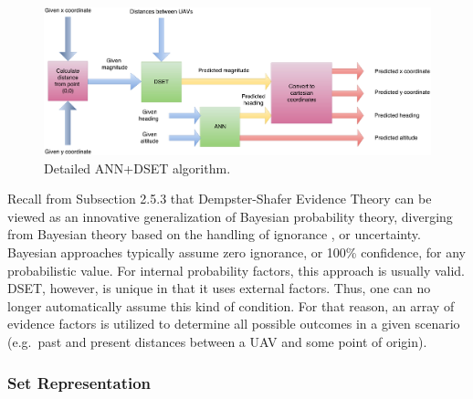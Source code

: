 \documentclass[12pt]{uthesis-v12}  %
\begin{document}
\begin{figure}[!t]
\centering
\includegraphics[width=5in]{dset}
\caption{Detailed ANN+DSET algorithm.}
\label{dset-fig}
\end{figure}

Recall from Subsection 2.5.3 that Dempster-Shafer Evidence Theory can be viewed as an innovative generalization of Bayesian probability theory, diverging from Bayesian theory based on the handling of ignorance \cite{bloch}, or uncertainty. Bayesian approaches typically assume zero ignorance, or 100\% confidence, for any probabilistic value. For internal probability factors, this approach is usually valid. DSET, however, is unique in that it uses external factors. Thus, one can no longer automatically assume this kind of condition. For that reason, an array of evidence factors is utilized to determine all possible outcomes in a given scenario (e.g.~past and present distances between a UAV and some point of origin). 

\subsubsection{Set Representation}
\end{document}
